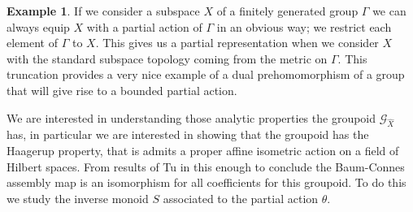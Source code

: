 \documentclass[11pt,]{amsbook}
\theoremstyle{plain}
\theoremstyle{definition}%
\newtheorem{example}[theorem]{Example}%
\theoremstyle{remark}%
\newcommand{\G}{\mathcal{G}}
\begin{document}
\begin{example}
If we consider a subspace $X$ of a finitely generated group $\Gamma$ we can always equip $X$ with a partial action of $\Gamma$ in an obvious way; we restrict each element of $\Gamma$ to $X$. This gives us a partial representation when we consider $X$ with the standard subspace topology coming from the metric on $\Gamma$. This truncation provides a very nice example of a dual prehomomorphism of a group that will give rise to a bounded partial action.
\end{example}


We are interested in understanding those analytic properties the groupoid $\G_{\widehat{X}}$ has, in particular we are interested in showing that the groupoid has the Haagerup property, that is admits a proper affine isometric action on a field of Hilbert spaces. From results of Tu in \cite{MR1703305} this enough to conclude the Baum-Connes assembly map is an isomorphism for all coefficients for this groupoid. To do this we study the inverse monoid $S$ associated to the partial action $\theta$.
\end{document}
